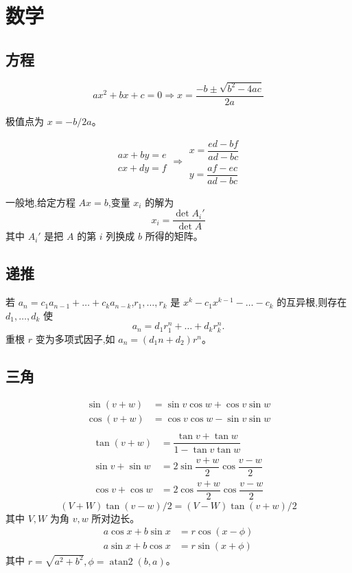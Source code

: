 
\chapter{数学}

\section{方程}
\[ax^2+bx+c=0 \Rightarrow x = \frac{-b\pm\sqrt{b^2-4ac}}{2a}\]

极值点为 $x = -b/2a$。

\[\begin{aligned}ax+by=e\\cx+dy=f\end{aligned}
\Rightarrow
\begin{aligned}x=\dfrac{ed-bf}{ad-bc}\\y=\dfrac{af-ec}{ad-bc}\end{aligned}\]

一般地,给定方程 $Ax = b$,变量 $x_i$ 的解为
\[x_i = \frac{\det A_i'}{\det A} \]
其中 $A_i'$ 是把 $A$ 的第 $i$ 列换成 $b$ 所得的矩阵。

\section{递推}
若 $a_n = c_1 a_{n-1} + \dots + c_k a_{n-k}$,$r_1, \dots, r_k$ 是 $x^k - c_1 x^{k-1} - \dots - c_k$ 的互异根,则存在 $d_1, \dots, d_k$ 使
\[a_n = d_1r_1^n + \dots + d_kr_k^n. \]
重根 $r$ 变为多项式因子,如 $a_n = (d_1n + d_2)r^n$。

\section{三角}
\begin{align*}
\sin(v+w)&{}=\sin v\cos w+\cos v\sin w\\
\cos(v+w)&{}=\cos v\cos w-\sin v\sin w\\
\end{align*}
\begin{align*}
\tan(v+w)&{}=\dfrac{\tan v+\tan w}{1-\tan v\tan w}\\
\sin v+\sin w&{}=2\sin\dfrac{v+w}{2}\cos\dfrac{v-w}{2}\\
\cos v+\cos w&{}=2\cos\dfrac{v+w}{2}\cos\dfrac{v-w}{2}
\end{align*}
\[ (V+W)\tan(v-w)/2{}=(V-W)\tan(v+w)/2 \]
其中 $V, W$ 为角 $v, w$ 所对边长。
\begin{align*}
	a\cos x+b\sin x&=r\cos(x-\phi)\\
	a\sin x+b\cos x&=r\sin(x+\phi)
\end{align*}
其中 $r=\sqrt{a^2+b^2}, \phi=\operatorname{atan2}(b,a)$。

